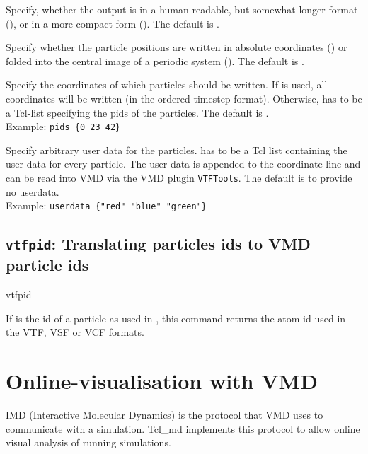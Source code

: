 \begin{arguments}
\item[\opt{\alt{short \asep verbose}}] Specify, whether the output is
  in a human-readable, but somewhat longer format (),
  or in a more compact form (). The default is
  .
  
\item[\opt{\alt{folded \asep absolute}}] Specify whether the particle
  positions are written in absolute coordinates ()
  or folded into the central image of a periodic system
  (). The default is .
  
\item[\opt{pids \alt{\var{pids} \asep all}}] Specify the coordinates
  of which particles should be written. If  is used, all
  coordinates will be written (in the ordered timestep format).
  Otherwise,  has to be a Tcl-list specifying the pids of
  the particles. The default is .\\
  Example: \verb!pids {0 23 42}!

\item[\opt{userdata \var{userdata}}] Specify arbitrary user data for
  the particles.  has to be a Tcl list containing the
  user data for every particle. The user data is appended to the
  coordinate line and can be read into VMD via the VMD plugin
  \texttt{VTFTools}. The default is to provide no userdata.\\
  Example: \verb!userdata {"red" "blue" "green"}!
\end{arguments}

\subsection{\texttt{vtfpid}: Translating \es particles ids to VMD
  particle ids}
\begin{essyntax}
  vtfpid 
\end{essyntax}
If  is the id of a particle as used in \es, this command
returns the atom id used in the VTF, VSF or VCF formats.

\section{Online-visualisation with VMD}
IMD (Interactive Molecular Dynamics) is the protocol that VMD uses to
communicate with a simulation. Tcl\_md implements this protocol to
allow online visual analysis of running simulations.

